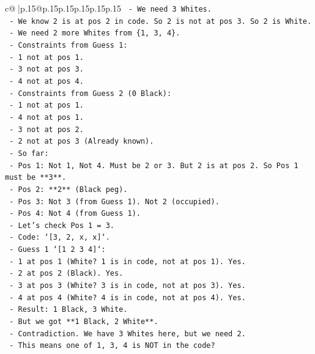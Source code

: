 \documentclass{article}
\begin{document}
{\begin{supertabular}{c@{$\;$}|p{.15\linewidth}@{}p{.15\linewidth}p{.15\linewidth}p{.15\linewidth}p{.15\linewidth}p{.15\linewidth}}
{{{\texttt{  {-} We need 3 Whites.} \\
\texttt{  {-} We know 2 is at pos 2 in code. So 2 is not at pos 3. So 2 is White.} \\
\texttt{  {-} We need 2 more Whites from \{1, 3, 4\}.} \\
\texttt{  {-} Constraints from Guess 1:} \\
\texttt{    {-} 1 not at pos 1.} \\
\texttt{    {-} 3 not at pos 3.} \\
\texttt{    {-} 4 not at pos 4.} \\
\texttt{  {-} Constraints from Guess 2 (0 Black):} \\
\texttt{    {-} 1 not at pos 1.} \\
\texttt{    {-} 4 not at pos 1.} \\
\texttt{    {-} 3 not at pos 2.} \\
\texttt{    {-} 2 not at pos 3 (Already known).} \\
\texttt{  {-} So far:} \\
\texttt{    {-} Pos 1: Not 1, Not 4. Must be 2 or 3. But 2 is at pos 2. So Pos 1 must be **3**.} \\
\texttt{    {-} Pos 2: **2** (Black peg).} \\
\texttt{    {-} Pos 3: Not 3 (from Guess 1). Not 2 (occupied).} \\
\texttt{    {-} Pos 4: Not 4 (from Guess 1).} \\
\texttt{  {-} Let's check Pos 1 = 3.} \\
\texttt{    {-} Code: `{[}3, 2, x, x{]}`.} \\
\texttt{    {-} Guess 1 `{[}1 2 3 4{]}`:} \\
\texttt{      {-} 1 at pos 1 (White? 1 is in code, not at pos 1). Yes.} \\
\texttt{      {-} 2 at pos 2 (Black). Yes.} \\
\texttt{      {-} 3 at pos 3 (White? 3 is in code, not at pos 3). Yes.} \\
\texttt{      {-} 4 at pos 4 (White? 4 is in code, not at pos 4). Yes.} \\
\texttt{      {-} Result: 1 Black, 3 White.} \\
\texttt{      {-} But we got **1 Black, 2 White**.} \\
\texttt{      {-} Contradiction. We have 3 Whites here, but we need 2.} \\
\texttt{      {-} This means one of 1, 3, 4 is NOT in the code?} \\
}}}
\end{supertabular}}
\end{document}

